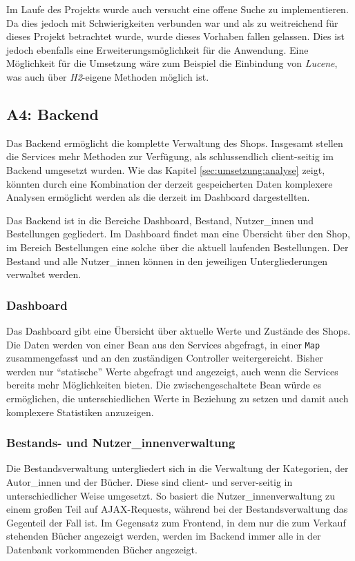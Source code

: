 	Im Laufe des Projekts wurde auch versucht eine offene Suche zu implementieren. Da dies jedoch mit Schwierigkeiten verbunden war und als zu weitreichend für dieses Projekt betrachtet wurde, wurde dieses Vorhaben fallen gelassen. Dies ist jedoch ebenfalls eine Erweiterungsmöglichkeit für die Anwendung. Eine Möglichkeit für die Umsetzung wäre zum Beispiel die Einbindung von \textit{Lucene}, was auch über \textit{H2}-eigene Methoden möglich ist.

	\subsection{A4: Backend}\label{sec:umsetzung:backend}
	Das Backend ermöglicht die komplette Verwaltung des Shops. Insgesamt stellen die Services mehr Methoden zur Verfügung, als schlussendlich client-seitig im Backend umgesetzt wurden. Wie das Kapitel \ref{sec:umsetzung:analyse} zeigt, könnten durch eine Kombination der derzeit gespeicherten Daten komplexere Analysen ermöglicht werden als die derzeit im Dashboard dargestellten.
	
	Das Backend ist in die Bereiche Dashboard, Bestand, Nutzer\_innen und Bestellungen gegliedert. Im Dashboard findet man eine Übersicht über den Shop, im Bereich Bestellungen eine solche über die aktuell laufenden Bestellungen. Der Bestand und alle Nutzer\_innen können in den jeweiligen Untergliederungen verwaltet werden.
	
		\subsubsection{Dashboard}
		Das Dashboard gibt eine Übersicht über aktuelle Werte und Zustände des Shops. Die Daten werden von einer Bean aus den Services abgefragt, in einer \lstinline|Map| zusammengefasst und an den zuständigen Controller weitergereicht. Bisher werden nur "`statische"' Werte abgefragt und angezeigt, auch wenn die Services bereits mehr Möglichkeiten bieten. Die zwischengeschaltete Bean würde es ermöglichen, die unterschiedlichen Werte in Beziehung zu setzen und damit auch komplexere Statistiken anzuzeigen.
	
		\subsubsection{Bestands- und Nutzer\_innenverwaltung}
		Die Bestandsverwaltung untergliedert sich in die Verwaltung der Kategorien, der Autor\_innen und der Bücher. Diese sind client- und server-seitig in unterschiedlicher Weise umgesetzt. So basiert die Nutzer\_innenverwaltung zu einem großen Teil auf AJAX-Requests, während bei der Bestandsverwaltung das Gegenteil der Fall ist. Im Gegensatz zum Frontend, in dem nur die zum Verkauf stehenden Bücher angezeigt werden, werden im Backend immer alle in der Datenbank vorkommenden Bücher angezeigt.
		
